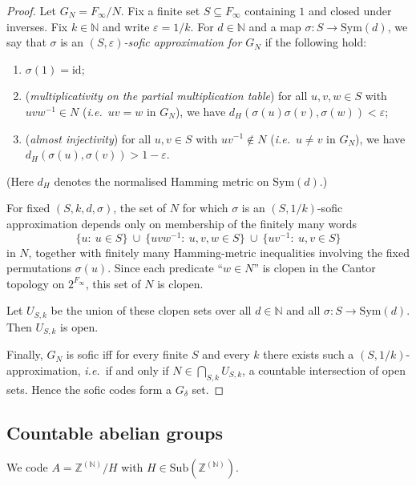 \documentclass[12pt,fleqn,a4paper]{amsart}
\numberwithin{equation}{section}
\theoremstyle{definition}
\newcommand{\N}{\mathbb{N}}
\newcommand{\Z}{\mathbb{Z}}
\newcommand{\Sub}{\mathrm{Sub}}
\begin{document}
\begin{proof}
Let $G_N=F_\infty/N$.  Fix a finite set $S\subseteq F_\infty$ containing $1$ and closed
under inverses.  Fix $k\in\N$ and write $\varepsilon=1/k$.  For $d\in\N$ and a map
$\sigma:S\to\mathrm{Sym}(d)$, we say that $\sigma$ is an \emph{$(S,\varepsilon)$-sofic
approximation for $G_N$} if the following hold:
\begin{enumerate}[label=\textup{(\alph*)}]
\item $\sigma(1)=\mathrm{id}$;
\item (\emph{multiplicativity on the partial multiplication table})
for all $u,v,w\in S$ with $uvw^{-1}\in N$ (\emph{i.e.}\ $uv=w$ in $G_N$), we have
$d_H(\sigma(u)\sigma(v),\sigma(w))<\varepsilon$;
\item (\emph{almost injectivity})
for all $u,v\in S$ with $uv^{-1}\notin N$ (\emph{i.e.}\ $u\ne v$ in $G_N$), we have
$d_H(\sigma(u),\sigma(v))>1-\varepsilon$.
\end{enumerate}
(Here $d_H$ denotes the normalised Hamming metric on $\mathrm{Sym}(d)$.)

For fixed $(S,k,d,\sigma)$, the set of $N$ for which $\sigma$ is an
$(S,1/k)$-sofic approximation depends only on membership of the finitely many words
\[
\{u:\ u\in S\}\ \cup\ \{uvw^{-1}:\ u,v,w\in S\}\ \cup\ \{uv^{-1}:\ u,v\in S\}
\]
in $N$, together with finitely many Hamming-metric inequalities involving the fixed
permutations $\sigma(u)$.  Since each predicate ``$w\in N$'' is clopen in the Cantor
topology on $2^{F_\infty}$, this set of $N$ is clopen.

Let $U_{S,k}$ be the union of these clopen sets over all $d\in\N$ and all
$\sigma:S\to\mathrm{Sym}(d)$.  Then $U_{S,k}$ is open.

Finally, $G_N$ is sofic iff for every finite $S$ and every $k$ there exists such a
$(S,1/k)$-approximation, \emph{i.e.}\ if and only if
$N\in \bigcap_{S,k} U_{S,k}$,
a countable intersection of open sets.  Hence the sofic codes form a $G_\delta$ set.
\end{proof}

\subsection{Countable abelian groups}\label{subsec:abelian}

We code $A=\Z^{(\N)}/H$ with $H\in\Sub(\Z^{(\N)})$.
\end{document}
